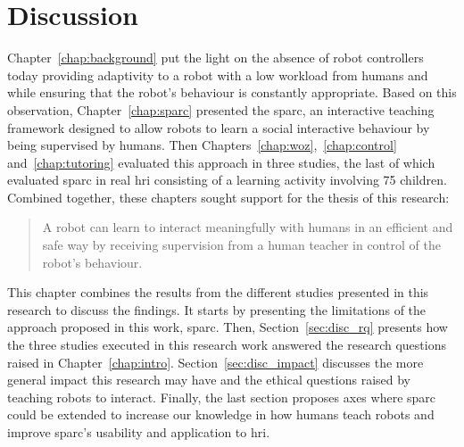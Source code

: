 \chapter{Discussion} \label{chap:discussion}
\glsresetall

Chapter~\ref{chap:background} put the light on the absence of robot controllers today providing adaptivity to a robot with a low workload from humans and while ensuring that the robot's behaviour is constantly appropriate. Based on this observation, Chapter~\ref{chap:sparc} presented the \gls{sparc}, an interactive teaching framework designed to allow robots to learn a social interactive behaviour by being supervised by humans. Then Chapters~\ref{chap:woz},~\ref{chap:control} and~\ref{chap:tutoring} evaluated this approach in three studies, the last of which evaluated \gls{sparc} in real \gls{hri} consisting of a learning activity involving 75 children. Combined together, these chapters sought support for the thesis of this research:

\begin{quote}
	A robot can learn to interact meaningfully with humans in an efficient and safe way by receiving supervision from a human teacher in control of the robot's behaviour.
\end{quote}

This chapter combines the results from the different studies presented in this research to discuss the findings. It starts by presenting the limitations of the approach proposed in this work, \gls{sparc}. Then, Section~\ref{sec:disc_rq} presents how the three studies executed in this research work answered the research questions raised in Chapter~\ref{chap:intro}. Section~\ref{sec:disc_impact} discusses the more general impact this research may have and the ethical questions raised by teaching robots to interact.
Finally, the last section proposes axes where \gls{sparc} could be extended to increase our knowledge in how humans teach robots and improve \gls{sparc}'s usability and application to \gls{hri}.


